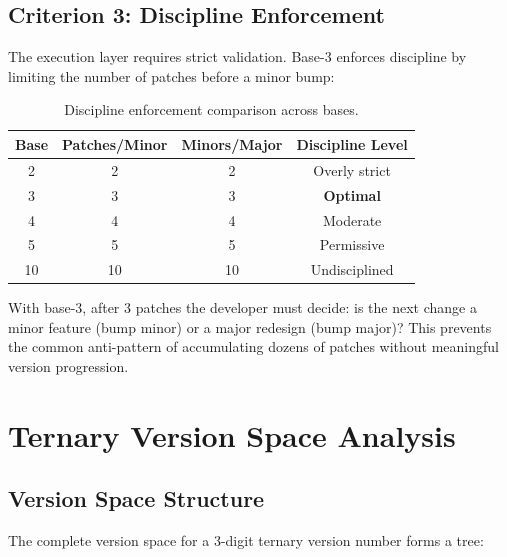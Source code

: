 \documentclass{article}
\begin{document}
\subsection{Criterion 3: Discipline Enforcement}

The execution layer requires strict validation. Base-3 enforces discipline by limiting the number of patches before a minor bump:

\begin{table}[h]
\centering
\caption{Discipline enforcement comparison across bases.}
\label{tab:discipline}
\begin{tabular}{cccc}
\toprule
\textbf{Base} & \textbf{Patches/Minor} & \textbf{Minors/Major} & \textbf{Discipline Level} \\
\midrule
2 & 2 & 2 & Overly strict \\
3 & 3 & 3 & \textbf{Optimal} \\
4 & 4 & 4 & Moderate \\
5 & 5 & 5 & Permissive \\
10 & 10 & 10 & Undisciplined \\
\bottomrule
\end{tabular}
\end{table}

With base-3, after 3 patches the developer must decide: is the next change a minor feature (bump minor) or a major redesign (bump major)? This prevents the common anti-pattern of accumulating dozens of patches without meaningful version progression.

\section{Ternary Version Space Analysis}

\subsection{Version Space Structure}

The complete version space for a 3-digit ternary version number forms a tree:
\end{document}
